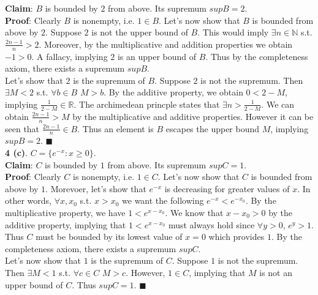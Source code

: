\documentclass[ 12pt ]{article}
\begin{document}
\noindent \textbf{Claim}: $B$ is bounded by $2$ from above. Its supremum
	$supB = 2$. \\

\noindent \textbf{Proof}: Clearly $B$ is nonempty, i.e. $1 \in B$.
	Let's now show that $B$ is bounded from above by $2$. Suppose $2$ is not the
	upper bound of $B$. This would imply $\exists n \in \mathbb{N}$ s.t.
	$\frac{2n - 1}{n} > 2$. Moreover, by the multiplicative and addition
	properties we obtain $-1 > 0$. A fallacy, implying $2$ is an upper bound of
	$B$. Thus by the completeness axiom, there exists a supremum $supB$. \\

\noindent Let's show that $2$ is the supremum of $B$. Suppose $2$ is not the supremum.
	Then $\exists M < 2$ s.t. $\forall b \in B$ $M > b$. By the additive
	property, we obtain $0 < 2 - M$, implying $\frac{1}{2 - M} \in \mathbb{R}$.
	The archimedean princple states that $\exists n > \frac{1}{2 - M}$. We can
	obtain $\frac{2n-1}{n} > M$ by the multiplicative and additive properties.
	However it can be seen that $\frac{2n-1}{n} \in B$. Thus an element is $B$
	escapes the upper bound $M$, implying $supB = 2$. $\blacksquare$ \\

\noindent \textbf{4 (c)}. $C = \{ e^{-x}: x \geq 0 \}$. \\

\noindent \textbf{Claim}: $C$ is bounded by $1$ from above. Its supremum
	$supC = 1$. \\

\noindent \textbf{Proof}: Clearly $C$ is nonempty, i.e. $1 \in C$.
	Let's now show that $C$ is bounded from above by $1$. Morevoer, let's show
	that $e^{-x}$ is decreasing for greater values of $x$. In other words,
	$\forall x, x_0$ s.t. $x > x_0$ we want the following $e^{-x} < e^{-x_0}$.
	By the multiplicative property, we have $1 < e^{x-x_0}$. We know that
	$x - x_0 > 0$ by the additive property, implying that $1 < e^{x-x_0}$
	must always hold since $\forall y > 0$, $e^y > 1$. Thus $C$ must be bounded
	by its lowest value of $x = 0$ which provides $1$. By the completeness
	axiom, there exists a supremum $supC$. \\

\noindent Let's now show that $1$ is the supremum of $C$. Suppose $1$ is not the
	supremum. Then $\exists M < 1$ s.t. $\forall c \in C$ $M > c$. However,
	$1 \in C$, implying that $M$ is not an upper bound of $C$. Thus $supC = 1$.
	$\blacksquare$ \\
\end{document}
